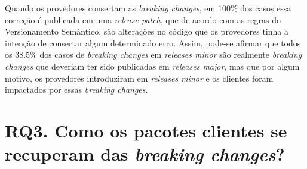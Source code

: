 Quando os provedores consertam as \textit{breaking changes}, em 100\% dos casos essa correção é publicada em uma \textit{release patch}, que de acordo com as regras do Versionamento Semântico, são alterações no código que os provedores tinha a intenção de consertar algum determinado erro. Assim, pode-se afirmar que todos os 38.5\% dos casos de \textit{breaking changes} em \textit{releases minor} são realmente \textit{breaking changes} que deveriam ter sido publicadas em \textit{releases major}, mas que por algum motivo, os provedores introduziram em \textit{releases minor} e os clientes foram impactados por essas \textit{breaking changes}.

\section{RQ3. Como os pacotes clientes se recuperam das \textit{breaking changes}?}

